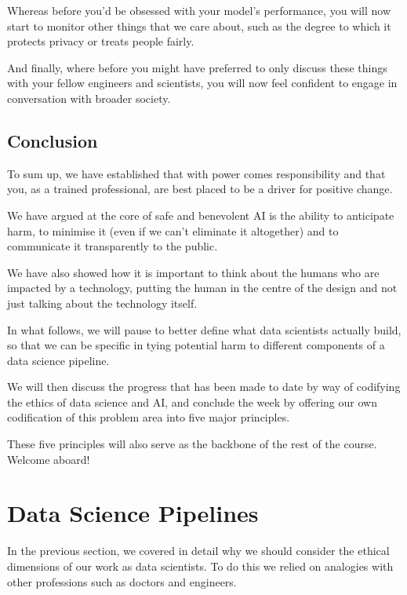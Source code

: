 \documentclass[
]{book}
\theoremstyle{definition}
\theoremstyle{definition}
\theoremstyle{definition}
\theoremstyle{definition}
\theoremstyle{remark}
\begin{document}
Whereas before you'd be obsessed with your model's performance, you will now start to monitor other things that we care about, such as the degree to which it protects privacy or treats people fairly.

And finally, where before you might have preferred to only discuss these things with your fellow engineers and scientists, you will now feel confident to engage
in conversation with broader society.

\hypertarget{conclusion}{%
\subsection{Conclusion}\label{conclusion}}

To sum up, we have established that with power comes responsibility and that you, as a trained professional, are best placed to be a driver for positive change.

We have argued at the core of safe and benevolent AI is the ability to anticipate
harm, to minimise it (even if we can't eliminate it altogether) and to communicate it transparently to the public.

We have also showed how it is important to think about the humans who are impacted by a technology, putting the human in the centre of the design and
not just talking about the technology itself.

In what follows, we will pause to better define what data scientists actually build, so that we can be specific in tying potential harm to different components of a data science pipeline.

We will then discuss the progress that has been made to date by way of codifying the ethics of data science and AI, and conclude the week by offering our own codification of this problem area into five major principles.

These five principles will also serve as the backbone of the rest of the course. Welcome aboard!

\hypertarget{data-science-pipelines}{%
\section{Data Science Pipelines}\label{data-science-pipelines}}

In the previous section, we covered in detail why we should consider the ethical dimensions of our work as data scientists. To do this we relied on analogies with other professions such as doctors and engineers.
\end{document}
